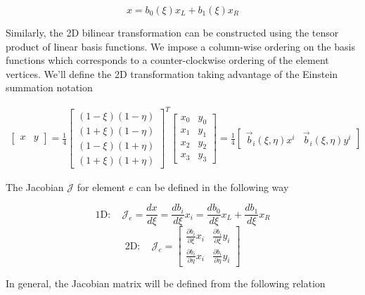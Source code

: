 \documentclass[11pt]{style/memo}
\begin{document}
\begin{equation}
    x = b_0(\xi) x_L + b_1(\xi) x_R
\end{equation}

Similarly, the 2D bilinear transformation can be constructed using the tensor product
of linear basis functions. We impose a column-wise ordering on the basis functions
which corresponds to a counter-clockwise ordering of the element vertices. We'll define
the 2D transformation taking advantage of the Einstein summation notation

\begin{eqnarray}
    \begin{bmatrix}
        x & y
    \end{bmatrix} = \frac{1}{4}
    \begin{bmatrix}
        (1-\xi)(1-\eta) \\
        (1+\xi)(1-\eta) \\
        (1-\xi)(1+\eta) \\
        (1+\xi)(1+\eta)
    \end{bmatrix}^T
    \begin{bmatrix}
        x_0 & y_0 \\
        x_1 & y_1 \\
        x_2 & y_2 \\
        x_3 & y_3
    \end{bmatrix}
    = \frac{1}{4}
    \begin{bmatrix}
        \vec{b}_i(\xi,\eta)x^i &
        \vec{b}_i(\xi,\eta)y^i
    \end{bmatrix}
\end{eqnarray}

The Jacobian $\mathcal{J}$ for element $e$ can be defined in the following way

\begin{equation*}
    \mathrm{1D:} \quad \mathcal{J}_e = \frac{dx}{d\xi} = \frac{db_i}{d\xi}x_i = \frac{db_0}{d\xi}x_L + \frac{db_1}{d\xi}x_R
\end{equation*}
\begin{equation*}
    \mathrm{2D:} \quad \mathcal{J}_e = \begin{bmatrix}
        \frac{\partial b_i}{\partial\xi}x_i & \frac{\partial b_i}{\partial\xi}y_i \\
        \frac{\partial b_i}{\partial\eta}x_i & \frac{\partial b_i}{\partial\eta}y_i
    \end{bmatrix}
\end{equation*}

In general, the Jacobian matrix will be defined from the following relation
\end{document}
